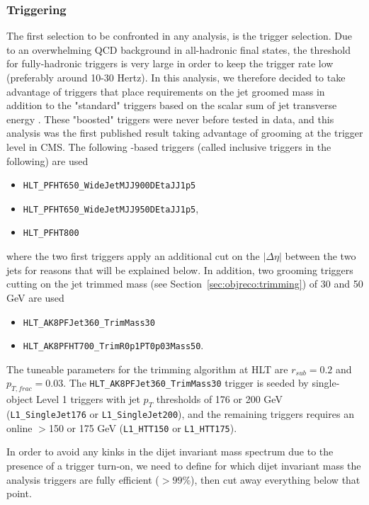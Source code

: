 \subsubsection{Triggering}
\label{sec:searchI:trigger}
The first selection to be confronted in any analysis, is the trigger selection. Due to an overwhelming QCD background in all-hadronic final states, the threshold for fully-hadronic triggers is very large in order to keep the trigger rate low (preferably around 10-30 Hertz). In this analysis, we therefore decided to take advantage of triggers that place requirements on the jet groomed mass in addition to the "standard" triggers based on the scalar sum of jet transverse energy \HT. These "boosted" triggers were never before tested in data, and this analysis was the first published result taking advantage of grooming at the trigger level in CMS. The following \HT-based triggers (called inclusive triggers in the following) are used
\begin{itemize}
\item \texttt{HLT\_PFHT650\_WideJetMJJ900DEtaJJ1p5}
\item \texttt{HLT\_PFHT650\_WideJetMJJ950DEtaJJ1p5},
\item \texttt{HLT\_PFHT800}
\end{itemize}
where the two first triggers apply an additional cut on the $|\Delta \eta|$ between the two jets for reasons that will be explained below. In addition, two grooming triggers cutting on the jet trimmed mass (see Section~\ref{sec:objreco:trimming}) of 30 and 50 GeV are used
\begin{itemize}
\item \texttt{HLT\_AK8PFJet360\_TrimMass30}
\item \texttt{HLT\_AK8PFHT700\_TrimR0p1PT0p03Mass50}.
\end{itemize}
The tuneable parameters for the trimming algorithm at HLT are $r_{sub}=0.2$ and $p_{T,frac}=0.03$. The \texttt{HLT\_AK8PFJet360\_TrimMass30} trigger is seeded by single-object Level 1 triggers with jet $p_T$ thresholds of 176 or 200 GeV (\texttt{L1\_SingleJet176} or \texttt{L1\_SingleJet200}), and the remaining triggers requires an online \HT{}$>$150 or 175 GeV (\texttt{L1\_HTT150} or \texttt{L1\_HTT175}).\par

In order to avoid any kinks in the dijet invariant mass spectrum due to the presence of a trigger turn-on, we need to define for which dijet invariant mass the analysis triggers are fully efficient ($>99\%$), then cut away everything below that point.

